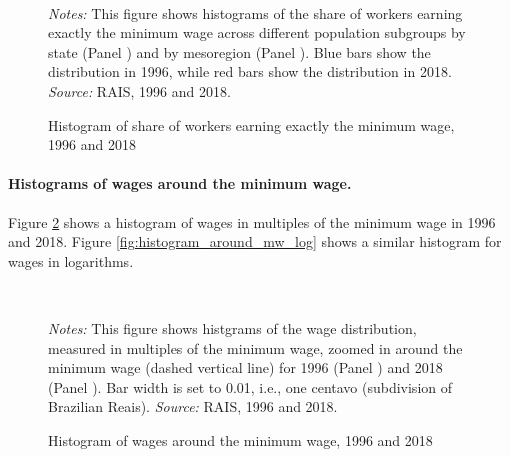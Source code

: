 \begin{figure}[!htb]
  \centering
  \caption{\label{fig:histogram_mw_shares}Histogram of share of workers earning exactly the minimum wage, 1996 and 2018}
  \prefigvspace
  \\
  \postfigvspace
  \begin{minipage}[t]{1\columnwidth}%
    \begin{spacing}{0.75}
      \emph{\scriptsize{}Notes: }{\scriptsize{}This figure shows histograms of the share of workers earning exactly the minimum wage across different population subgroups by state (Panel ) and by mesoregion (Panel ). Blue bars show the distribution in 1996, while red bars show the distribution in 2018. %
      \emph{\scriptsize{}Source: } RAIS, 1996 and 2018.}
    \end{spacing}
  \end{minipage}
\end{figure}


\paragraph{Histograms of wages around the minimum wage.}

Figure \ref{fig:histogram_around_mw} shows a histogram of wages in multiples of the minimum wage in 1996 and 2018. Figure \ref{fig:histogram_around_mw_log} shows a similar histogram for wages in logarithms.

\begin{figure}[!htb]
  \centering
  \caption{\label{fig:histogram_around_mw}Histogram of wages around the minimum wage, 1996 and 2018}
  \prefigvspace
  \\
  \postfigvspace
  \begin{minipage}[t]{1\columnwidth}%
    \begin{spacing}{0.75}
      \emph{\scriptsize{}Notes: }{\scriptsize{}This figure shows histgrams of the wage distribution, measured in multiples of the minimum wage, zoomed in around the minimum wage (dashed vertical line) for 1996 (Panel ) and 2018 (Panel ). Bar width is set to 0.01, i.e., one centavo (subdivision of Brazilian Reais). %
      \emph{\scriptsize{}Source: } RAIS, 1996 and 2018.}
    \end{spacing}
  \end{minipage}
\end{figure}



